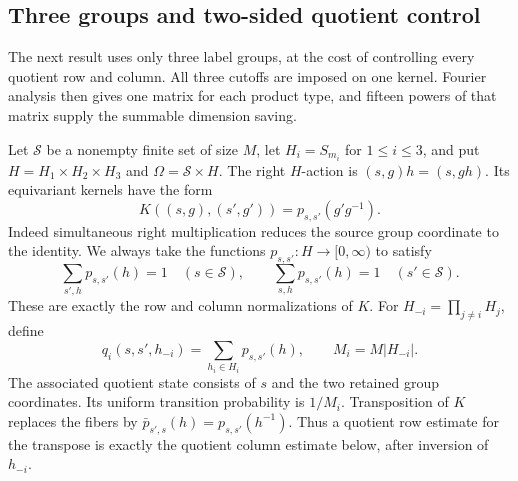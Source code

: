 \subsection{Three groups and two-sided quotient control}

The next result uses only three label groups, at the cost of controlling
every quotient row and column.  All three cutoffs are imposed on one
kernel.  Fourier analysis then gives one matrix for each product type,
and fifteen powers of that matrix supply the summable dimension saving.

Let $\mathcal S$ be a nonempty finite set of size $M$, let
$H_i=S_{m_i}$ for $1\le i\le3$, and put
$H=H_1\times H_2\times H_3$ and $\Omega=\mathcal S\times H$.
The right $H$-action is $(s,g)h=(s,gh)$.  Its equivariant kernels
have the form
\begin{equation}
 K((s,g),(s',g'))=p_{s,s'}(g'g^{-1}).
 \label{l:three-convolution-kernel}
\end{equation}
Indeed simultaneous right multiplication reduces the source group
coordinate to the identity.  We always take the functions
$p_{s,s'}:H\to[0,\infty)$ to satisfy
\begin{equation}
 \sum_{s',h}p_{s,s'}(h)=1\quad(s\in\mathcal S),\qquad
 \sum_{s,h}p_{s,s'}(h)=1\quad(s'\in\mathcal S).
 \label{l:three-bistochastic}
\end{equation}
These are exactly the row and column normalizations of $K$.
For $H_{-i}=\prod_{j\ne i}H_j$, define
\[
 q_i(s,s',h_{-i})=\sum_{h_i\in H_i}p_{s,s'}(h),
 \qquad M_i=M|H_{-i}|.
\]
The associated quotient state consists of $s$ and the two retained
group coordinates.  Its uniform transition probability is $1/M_i$.
Transposition of $K$ replaces the fibers by
$\bar p_{s',s}(h)=p_{s,s'}(h^{-1})$.  Thus a quotient row estimate
for the transpose is exactly the quotient column estimate below,
after inversion of $h_{-i}$.

